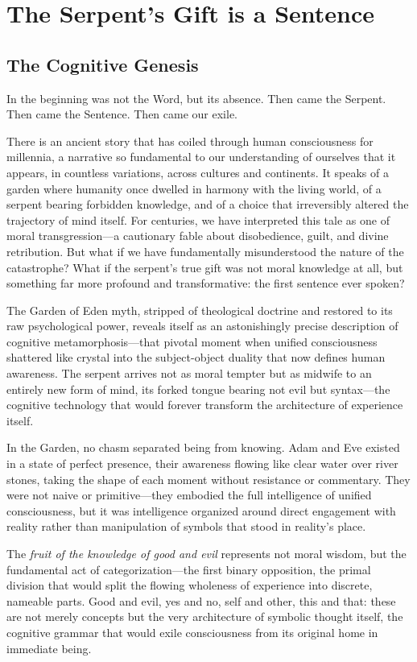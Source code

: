 \chapter{The Serpent's Gift is a Sentence}

\section{The Cognitive Genesis}

In the beginning was not the Word, but its absence.
Then came the Serpent.
Then came the Sentence.
Then came our exile.

There is an ancient story that has coiled through human consciousness for millennia, a narrative so fundamental to our understanding of ourselves that it appears, in countless variations, across cultures and continents. It speaks of a garden where humanity once dwelled in harmony with the living world, of a serpent bearing forbidden knowledge, and of a choice that irreversibly altered the trajectory of mind itself. For centuries, we have interpreted this tale as one of moral transgression—a cautionary fable about disobedience, guilt, and divine retribution. But what if we have fundamentally misunderstood the nature of the catastrophe? What if the serpent's true gift was not moral knowledge at all, but something far more profound and transformative: the first sentence ever spoken?

The Garden of Eden myth, stripped of theological doctrine and restored to its raw psychological power, reveals itself as an astonishingly precise description of cognitive metamorphosis—that pivotal moment when unified consciousness shattered like crystal into the subject-object duality that now defines human awareness. The serpent arrives not as moral tempter but as midwife to an entirely new form of mind, its forked tongue bearing not evil but syntax—the cognitive technology that would forever transform the architecture of experience itself.

In the Garden, no chasm separated being from knowing. Adam and Eve existed in a state of perfect presence, their awareness flowing like clear water over river stones, taking the shape of each moment without resistance or commentary. They were not naive or primitive—they embodied the full intelligence of unified consciousness, but it was intelligence organized around direct engagement with reality rather than manipulation of symbols that stood in reality's place.

The \textit{fruit of the knowledge of good and evil} represents not moral wisdom, but the fundamental act of categorization—the first binary opposition, the primal division that would split the flowing wholeness of experience into discrete, nameable parts. Good and evil, yes and no, self and other, this and that: these are not merely concepts but the very architecture of symbolic thought itself, the cognitive grammar that would exile consciousness from its original home in immediate being.

